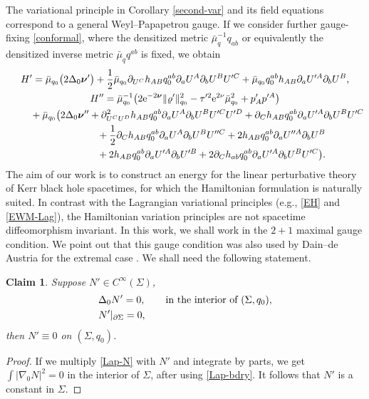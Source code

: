 \documentclass[pdftex]{sigma}
\def\ptl{\partial}%
\def\mbo#1{\boldsymbol{#1}}%
\def\grad{{\nabla}}%
\def\halb{\frac{1}{2}}%
\numberwithin{equation}{section}
\newtheorem{claim}[Theorem]{Claim}
 { \theoremstyle{definition}
\newtheorem{Definition}[Theorem]{Definition}
\newtheorem{Note}[Theorem]{Note}
\newtheorem{Example}[Theorem]{Example}
\newtheorem{Remark}[Theorem]{Remark} }
\begin{document}
The variational principle in Corollary \ref{second-var} and its field equations correspond to a general Weyl--Papapetrou gauge. If we consider further gauge-fixing \eqref{conformal}, where the densitized metric $ \bar{\mu}^{-1}_q q_{ab}$ or equivalently the densitized inverse metric $\bar{\mu}_q q^{ab}$ is fixed, we obtain
\begin{gather*}
H' = \bar{\mu}_{q_0} \bigl(2 \Delta_0 \mbo{\nu}'\bigr) + \halb \bar{\mu}_{q_0} \ptl_{U^C} h_{AB} q_0^{ab} \ptl_a U^A \ptl_b U^B U'^C
+ \bar{\mu}_{q_0} q_0^{ab} h_{AB} \ptl_a U'^A \ptl_b U^B, \notag\\
H'' =\bar{\mu}^{-1}_{q_0} \bigl(2 {\rm e}^{-2\mbo{\nu}} \Vert \varrho' \Vert^2_{q_0} - \tau'^2 {\rm e}^{2\nu} \bar{\mu}^2_{q_0} + p'_A p'^A\bigr)\notag \\
\hphantom{H'' =}{}
+ \bar{\mu}_{q_0} \bigl(2 \Delta_0 \mbo{\nu}'' + \ptl^2_{U^C U^D} h_{AB} q^{ab}_0 \ptl_a U^A \ptl_b U^B U'^C U'^D + \ptl_C h_{AB} q^{ab}_0 \ptl_a U'^A \ptl_b U^B U'^C \notag\\
\hphantom{H'' =+ \bar{\mu}_{q_0} \bigl(}{}
+ \halb \ptl_Ch_{AB} q_{0}^{ab} \ptl_a U^A \ptl_b U^B U''^C + 2 h_{AB} q^{ab}_{0} \ptl_a U''^A \ptl_b U^B \notag\\
\hphantom{H'' =+ \bar{\mu}_{q_0} \bigl(}{}
+ 2h_{AB} q^{ab}_0 \ptl_a U'^A \ptl_bU'^B + 2 \ptl_C h_{ab} q^{ab}_0 \ptl_a U'^A \ptl_b U^B U'^C \bigr).
\end{gather*}
The aim of our work is to construct an energy for the linear perturbative theory of Kerr black hole spacetimes, for which the Hamiltonian formulation is naturally suited. In contrast with the Lagrangian variational principles (e.g., \eqref{EH} and \eqref{EWM-Lag}), the Hamiltonian variation principles are not spacetime diffeomorphism invariant.
In this work, we shall work in the $2 + 1$ maximal gauge condition. We point out that this gauge condition was also used by Dain--de Austria for the extremal case \cite{DA_14}. We shall need the following statement.

\begin{claim} \label{2+1max}
Suppose $N' \in C^{\infty} (\Sigma)$,
\begin{subequations}
\begin{align}
&\Delta_0 N' = 0, \qquad \textnormal{in the interior of $(\Sigma, q_0 )$}, \label{Lap-N}\\
&N' \vert_{\ptl \Sigma}= 0, \label{Lap-bdry}
\end{align}
\end{subequations}
 then $ N' \equiv 0$ on $(\Sigma, q_0)$.
\end{claim}
\begin{proof}
If we multiply \eqref{Lap-N} with $N'$ and integrate by parts, we get $\int \vert \grad_0 N \vert^2 =0$ in the interior of $\Sigma$, after using \eqref{Lap-bdry}. It follows that $N'$ is a constant in $\Sigma$.
\end{proof}
\end{document}
